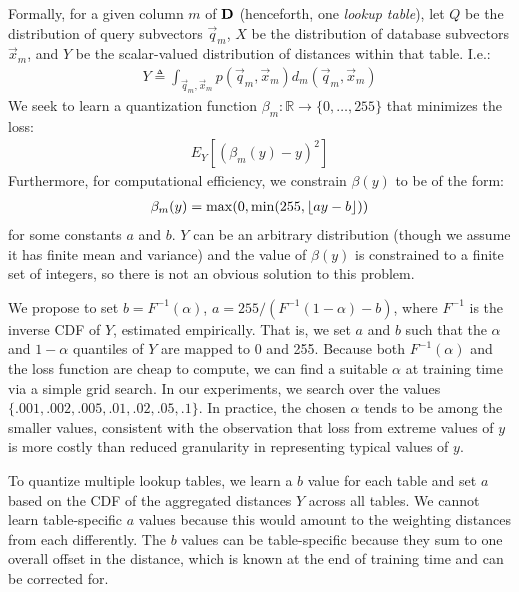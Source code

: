 Formally, for a given column $m$ of $\mat{D}$ (henceforth, one \textit{lookup table}), let $Q$ be the distribution of query subvectors $\vec{q}_m$, $X$ be the distribution of database subvectors $\vec{x}_m$, and $Y$ be the scalar-valued distribution of distances within that table. I.e.:
\begin{align}
    Y \triangleq \int_{\vec{q}_m, \vec{x}_m} p(\vec{q}_m, \vec{x}_m)d_m(\vec{q}_m, \vec{x}_m)
\end{align}
We seek to learn a quantization function $\beta_m: \mathbb{R} \rightarrow \{0,\ldots,255\} $ that minimizes the loss:
\begin{align}
    E_Y[(\beta_m(y) - y)^2]
\end{align}
Furthermore, for computational efficiency, we constrain $\beta(y)$ to be of the form:
\begin{align}
    \beta_m(y) = \max(0, \min(255, \floor*{ay - b}))
\end{align}
for some constants $a$ and $b$. $Y$ can be an arbitrary distribution (though we assume it has finite mean and variance) and the value of $\beta(y)$ is constrained to a finite set of integers, so there is not an obvious solution to this problem.

We propose to set $b = F^{-1}(\alpha)$, $a = 255 / (F^{-1}(1 - \alpha) - b)$, where $F^{-1}$ is the inverse CDF of $Y$, estimated empirically. That is, we set $a$ and $b$ such that the $\alpha$ and $1 - \alpha$ quantiles of $Y$ are mapped to 0 and 255. Because both $F^{-1}(\alpha)$ and the loss function are cheap to compute, we can find a suitable $\alpha$ at training time via a simple grid search. In our experiments, we search over the values $\{.001, .002, .005, .01, .02, .05, .1\}$. In practice, the chosen $\alpha$ tends to be among the smaller values, consistent with the observation that loss from extreme values of $y$ is more costly than reduced granularity in representing typical values of $y$.

To quantize multiple lookup tables, we learn a $b$ value for each table and set $a$ based on the CDF of the aggregated distances $Y$ across all tables. We cannot learn table-specific $a$ values because this would amount to the weighting distances from each differently. The $b$ values can be table-specific because they sum to one overall offset in the distance, which is known at the end of training time and can be corrected for.

